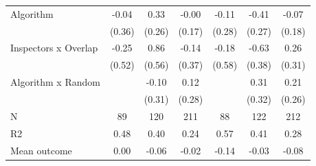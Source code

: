 \begin{tabular}{lccc|ccc}
Algorithm   &       -0.04         &        0.33         &       -0.00         &       -0.11         &       -0.41         &       -0.07         \\
            &      (0.36)         &      (0.26)         &      (0.17)         &      (0.28)         &      (0.27)         &      (0.18)         \\
\addlinespace
Inspectors x Overlap&       -0.25         &        0.86         &       -0.14         &       -0.18         &       -0.63         &        0.26         \\
            &      (0.52)         &      (0.56)         &      (0.37)         &      (0.58)         &      (0.38)         &      (0.31)         \\
\addlinespace
Algorithm x Random&                     &       -0.10         &        0.12         &                     &        0.31         &        0.21         \\
            &                     &      (0.31)         &      (0.28)         &                     &      (0.32)         &      (0.26)         \\
\midrule
N           &          89         &         120         &         211         &          88         &         122         &         212         \\
R2          &        0.48         &        0.40         &        0.24         &        0.57         &        0.41         &        0.28         \\
Mean outcome&        0.00         &       -0.06         &       -0.02         &       -0.14         &       -0.03         &       -0.08         \\
\bottomrule \end{tabular}
